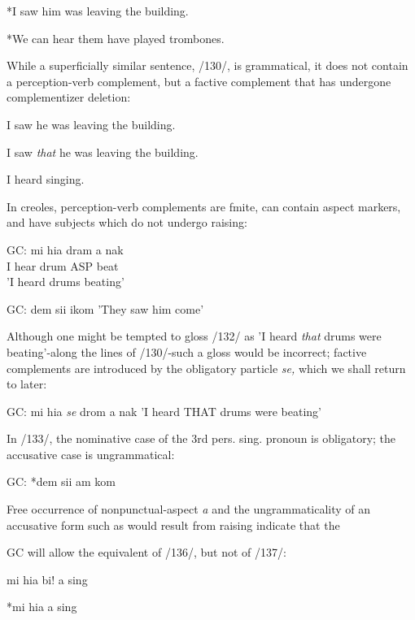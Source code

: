 \ea\label{ex:128}
 *I saw him was leaving the building.
\z

\ea\label{ex:129}
 *We can hear them have played trombones.
\z

While a superficially similar sentence, /130/, is grammatical, it does not contain a perception-verb complement, but a factive complement that has undergone complementizer deletion:

  


 


\ea\label{ex:130}
 I saw he was leaving the building.
\z

\ea\label{ex:131}
 I saw \textit{that} he was leaving the building.
\z

\ea\label{ex:137}
 I heard singing.
\z

In creoles, perception-verb complements are fmite, can contain aspect markers, and have subjects which do not undergo raising:

\ea\label{ex:132}
\gll  GC: mi hia dram a nak\\
I hear drum ASP beat\\
\glt 'I heard drums beating'
\z




\ea\label{ex:133}
 GC: dem sii ikom
\glt'They saw him come'
\z



Although one might be tempted to gloss /132/ as 'I heard \textit{that} drums were beating'{}-along the lines of /130/{}-such a gloss would be incorrect;
factive complements are introduced by the obligatory particle \textit{se,}
which we shall return to later:

\ea\label{ex:134}
 GC: mi hia \textit{se} drom a nak
\glt 'I heard THAT drums were beating'
\z



In /133/, the nominative case of the 3rd pers. sing. pronoun is obliga\-tory; the accusative case is ungrammatical:

\ea\label{ex:135}
 GC: *dem sii am kom
\z

Free occurrence of nonpunctual-aspect \textit{a} and the ungrammaticality of an accusative form such as would result from raising indicate that the

GC will allow the equivalent of /136/, but not of /137/:

\ea\label{ex:138}
 mi hia bi! a sing
\z

\ea\label{ex:139}
 *mi hia a sing
\z

